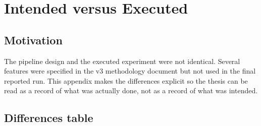 \documentclass[../preamble.tex]{subfiles}
\begin{document}
\chapter{Intended versus Executed}
\label{app:intended-executed}

\section{Motivation}
\label{app:intended-why}

The pipeline design and the executed experiment were not identical. Several
features were specified in the v3 methodology document but not used in the
final reported run. This appendix makes the differences explicit so the
thesis can be read as a record of what was actually done, not as a record
of what was intended.

\section{Differences table}
\label{app:intended-table}
\end{document}
